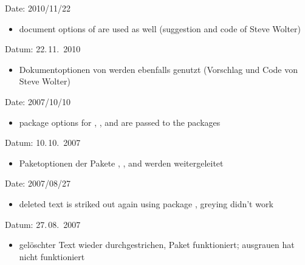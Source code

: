 
\ifENGLISH
	Date: 2010/11/22
	\begin{itemize}
	\item document options of  are used as well (suggestion and code of Steve Wolter)
	\end{itemize}
\fi
	\ifGERMAN
		Datum: 22.\,11.~2010
		\begin{itemize}
		\item Dokumentoptionen von  werden ebenfalls genutzt (Vorschlag und Code von Steve Wolter)
		\end{itemize}
	\fi


\ifENGLISH
	Date: 2007/10/10
	\begin{itemize}
	\item package options for , , and  are passed to the packages
	\end{itemize}
\fi
	\ifGERMAN
		Datum: 10.\,10.~2007
		\begin{itemize}
		\item Paketoptionen der Pakete , , and  werden weitergeleitet
		\end{itemize}
	\fi


\ifENGLISH
	Date: 2007/08/27
	\begin{itemize}
	\item deleted text is striked out again using package , greying didn't work
	\end{itemize}
\fi
	\ifGERMAN
		Datum: 27.\,08.~2007
		\begin{itemize}
		\item gelöschter Text wieder durchgestrichen, Paket  funktioniert; ausgrauen hat nicht funktioniert
		\end{itemize}
	\fi



